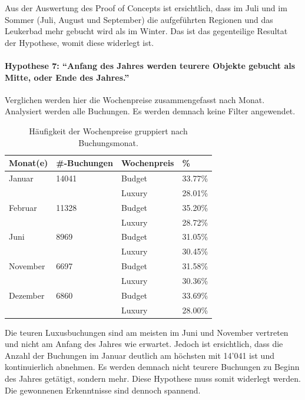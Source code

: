 Aus der Auswertung des Proof of Concepts ist ersichtlich, dass im Juli und im Sommer (Juli, August und September) die aufgeführten Regionen und das Leukerbad mehr gebucht wird als im Winter. Das ist das gegenteilige Resultat der Hypothese, womit diese widerlegt ist.

\paragraph{Hypothese 7: "`Anfang des Jahres werden teurere Objekte gebucht als Mitte, oder Ende des Jahres."'} Verglichen werden hier die Wochenpreise zusammengefasst nach Monat. Analysiert werden alle Buchungen. Es werden demnach keine Filter angewendet.
\begin{table}[H] 
	\caption{Häufigkeit der Wochenpreise gruppiert nach Buchungsmonat.}
	\centering
	\label{fig:testingfazit:testing:hypothesen:7}
	\begin{tabular}{ | l | l | l | l | } 
		\hline 
		\rowcolor{tableheadcolor}
		\bfseries Monat(e) & \bfseries \#-Buchungen & \bfseries Wochenpreis & \bfseries \% \\ \hline 
		Januar & 14041 & Budget & 33.77\% \\ \cline{3-4} 
		 & & Luxury & 28.01\% \\ \hline
		 Februar & 11328 & Budget & 35.20\% \\ \cline{3-4} 
 		 & & Luxury & 28.72\% \\ \hline
		 Juni & 8969 & Budget & 31.05\% \\ \cline{3-4} 
 		 & & Luxury & 30.45\% \\ \hline
		 November & 6697 & Budget & 31.58\% \\ \cline{3-4}
 		 & & Luxury & 30.36\% \\ \hline
		 Dezember & 6860 & Budget & 33.69\% \\ \cline{3-4} 
 		 & & Luxury & 28.00\% \\ \hline		 
	\end{tabular}
\end{table}

Die teuren Luxusbuchungen sind am meisten im Juni und November vertreten und nicht am Anfang des Jahres wie erwartet. Jedoch ist ersichtlich, dass die Anzahl der Buchungen im Januar deutlich am höchsten mit 14'041 ist und kontinuierlich abnehmen. Es werden demnach nicht teurere Buchungen zu Beginn des Jahres getätigt, sondern mehr. Diese Hypothese muss somit widerlegt werden. Die gewonnenen Erkenntnisse sind dennoch spannend. 

